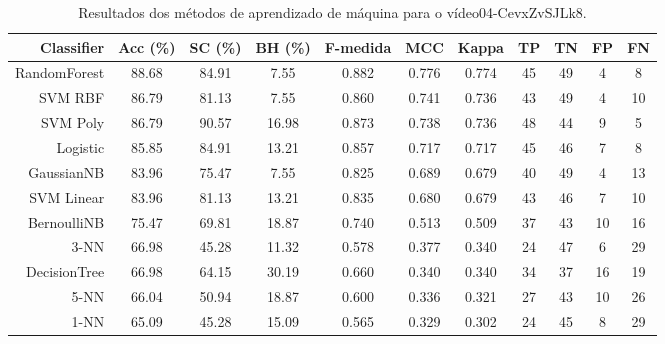 \begin{table}[!htb]
\centering
\caption{Resultados dos métodos de aprendizado de máquina para o vídeo04-CevxZvSJLk8.}
\label{tab:04-CevxZvSJLk8}
\begin{tabular}{r|c|c|c|c|c|c|c|c|c|c}
\hline\hline
Classifier & Acc (\%) & SC (\%) & BH (\%) & F-medida & MCC & Kappa & TP & TN & FP & FN \\ \hline
RandomForest & 88.68 & 84.91 & 7.55 & 0.882 & 0.776 & 0.774 & 45 & 49 & 4 & 8 \\ 
SVM RBF & 86.79 & 81.13 & 7.55 & 0.860 & 0.741 & 0.736 & 43 & 49 & 4 & 10 \\ 
SVM Poly & 86.79 & 90.57 & 16.98 & 0.873 & 0.738 & 0.736 & 48 & 44 & 9 & 5 \\ 
Logistic & 85.85 & 84.91 & 13.21 & 0.857 & 0.717 & 0.717 & 45 & 46 & 7 & 8 \\ 
GaussianNB & 83.96 & 75.47 & 7.55 & 0.825 & 0.689 & 0.679 & 40 & 49 & 4 & 13 \\ 
SVM Linear & 83.96 & 81.13 & 13.21 & 0.835 & 0.680 & 0.679 & 43 & 46 & 7 & 10 \\ 
BernoulliNB & 75.47 & 69.81 & 18.87 & 0.740 & 0.513 & 0.509 & 37 & 43 & 10 & 16 \\ 
3-NN & 66.98 & 45.28 & 11.32 & 0.578 & 0.377 & 0.340 & 24 & 47 & 6 & 29 \\ 
DecisionTree & 66.98 & 64.15 & 30.19 & 0.660 & 0.340 & 0.340 & 34 & 37 & 16 & 19 \\ 
5-NN & 66.04 & 50.94 & 18.87 & 0.600 & 0.336 & 0.321 & 27 & 43 & 10 & 26 \\ 
1-NN & 65.09 & 45.28 & 15.09 & 0.565 & 0.329 & 0.302 & 24 & 45 & 8 & 29 \\ 
\hline\hline
\end{tabular}
\end{table}
